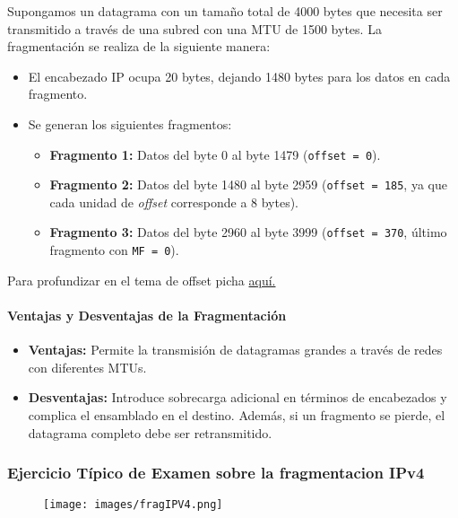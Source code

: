 \documentclass[a4paper,12pt]{article}
\begin{document}
Supongamos un datagrama con un tamaño total de 4000 bytes que necesita ser transmitido a través de una subred con una MTU de 1500 bytes. La fragmentación se realiza de la siguiente manera:
\begin{itemize}
    \item El encabezado IP ocupa 20 bytes, dejando 1480 bytes para los datos en cada fragmento.
    \item Se generan los siguientes fragmentos:
    \begin{itemize}
        \item \textbf{Fragmento 1:} Datos del byte 0 al byte 1479 (\texttt{offset = 0}).
        \item \textbf{Fragmento 2:} Datos del byte 1480 al byte 2959 (\texttt{offset = 185}, ya que cada unidad de \textit{offset} corresponde a 8 bytes).
        \item \textbf{Fragmento 3:} Datos del byte 2960 al byte 3999 (\texttt{offset = 370}, último fragmento con \texttt{MF = 0}).
    \end{itemize}
\end{itemize}

Para profundizar en el tema de offset picha \href{https://github.com/ElblogdeIsmael/ElblogdeIsmael.github.io/blob/main/Asignaturas/Tercer%20A%C3%B1o/FR/Resumenes/ETSIIT/offset.md}{aquí.}

\paragraph{Ventajas y Desventajas de la Fragmentación}
\begin{itemize}
    \item \textbf{Ventajas:} Permite la transmisión de datagramas grandes a través de redes con diferentes MTUs.
    \item \textbf{Desventajas:} Introduce sobrecarga adicional en términos de encabezados y complica el ensamblado en el destino. Además, si un fragmento se pierde, el datagrama completo debe ser retransmitido.
\end{itemize}


\subsubsection{Ejercicio Típico de Examen sobre la fragmentacion IPv4}


\begin{figure}[H]
    \centering
    \texttt{[image: images/fragIPV4.png]}
\end{figure}
\end{document}
